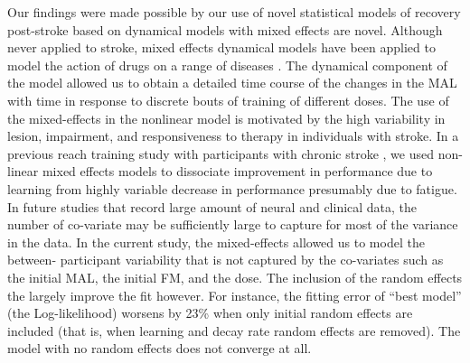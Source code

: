 Our findings were made possible by our use of novel statistical models of recovery post-stroke based on dynamical models with mixed effects are novel.
Although never applied to stroke, mixed effects dynamical models have been applied to model the action of drugs on a range of diseases \cite{Cazelles1997, Tan2000}.  
The dynamical component of the model allowed us to obtain a detailed time course of the changes in the MAL with time in response to discrete bouts of training of different doses. 
The use of the mixed-effects in the nonlinear model is motivated by the high variability in lesion, impairment, and responsiveness to therapy in individuals with stroke. 
In a previous reach training study with participants with chronic stroke \cite{Park2017}, we used non-linear mixed effects models to dissociate improvement in performance due to learning from highly variable decrease in performance presumably due to fatigue. 
In future studies that record large amount of neural and clinical data, the number of co-variate may be sufficiently large to capture for most of the variance in the data. 
In the current study, the mixed-effects allowed us to model the between- participant variability that is not captured by the co-variates such as the initial MAL, the initial FM, and the dose. 
The inclusion of the random effects the largely improve the fit however. 
For instance, the fitting error of  “best model” (the Log-likelihood) worsens by 23\% when only initial random effects are included (that is, when learning and decay rate random effects are removed). 
The model with no random effects does not converge at all. 

